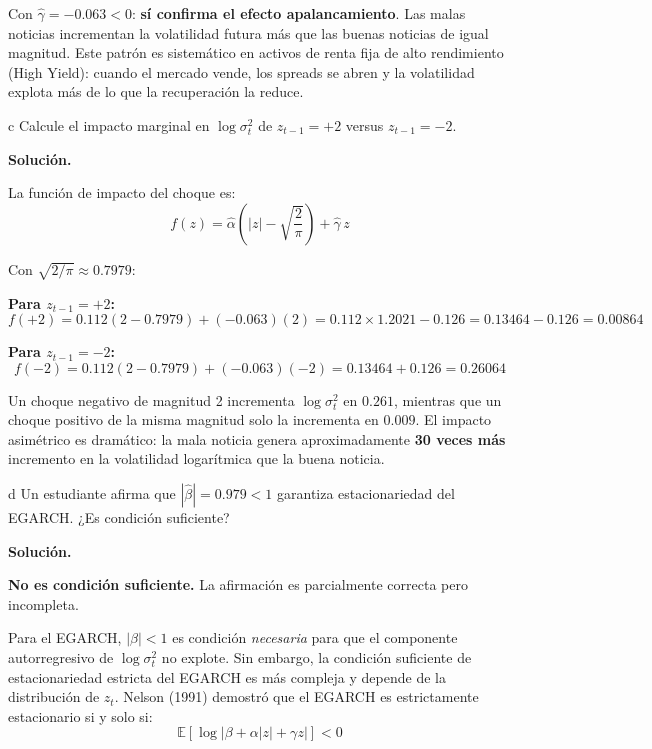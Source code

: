 \documentclass[11pt,a4paper]{article}
\newcommand{\E}{\mathbb{E}}
\newcommand{\sigmat}{\sigma^2_t}
\begin{document}
Con $\hat{\gamma}=-0.063<0$: \textbf{sí confirma el efecto apalancamiento}. Las malas noticias incrementan la volatilidad futura más que las buenas noticias de igual magnitud. Este patrón es sistemático en activos de renta fija de alto rendimiento (High Yield): cuando el mercado vende, los spreads se abren y la volatilidad explota más de lo que la recuperación la reduce.

\begin{cajaInciso}{c}
Calcule el impacto marginal en $\log\sigmat$ de $z_{t-1}=+2$ versus $z_{t-1}=-2$.
\end{cajaInciso}

\textbf{Solución.}

La función de impacto del choque es:
\[
f(z) = \hat{\alpha}\!\left(|z| - \sqrt{\frac{2}{\pi}}\right) + \hat{\gamma}\,z
\]

Con $\sqrt{2/\pi}\approx 0.7979$:

\textbf{Para $z_{t-1}=+2$:}
\[
f(+2) = 0.112(2 - 0.7979) + (-0.063)(2) = 0.112\times 1.2021 - 0.126 = 0.13464 - 0.126 = 0.00864
\]

\textbf{Para $z_{t-1}=-2$:}
\[
f(-2) = 0.112(2 - 0.7979) + (-0.063)(-2) = 0.13464 + 0.126 = 0.26064
\]

Un choque negativo de magnitud 2 incrementa $\log\sigmat$ en $0.261$, mientras que un choque positivo de la misma magnitud solo la incrementa en $0.009$. El impacto asimétrico es dramático: la mala noticia genera aproximadamente \textbf{30 veces más} incremento en la volatilidad logarítmica que la buena noticia.

\begin{cajaInciso}{d}
Un estudiante afirma que $|\hat{\beta}|=0.979<1$ garantiza estacionariedad del EGARCH. ¿Es condición suficiente?
\end{cajaInciso}

\textbf{Solución.}

\textbf{No es condición suficiente.} La afirmación es parcialmente correcta pero incompleta.

Para el EGARCH, $|\beta|<1$ es condición \emph{necesaria} para que el componente autorregresivo de $\log\sigmat$ no explote. Sin embargo, la condición suficiente de estacionariedad estricta del EGARCH es más compleja y depende de la distribución de $z_t$. Nelson (1991) demostró que el EGARCH es estrictamente estacionario si y solo si:
\[
\E\!\left[\log\!\left|\beta + \alpha|z| + \gamma z\right|\right] < 0
\]
\end{document}
